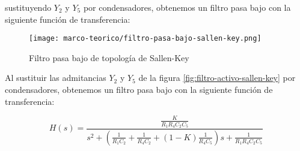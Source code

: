 sustituyendo $Y_2$ y $Y_5$ por condensadores, obtenemos un filtro pasa bajo con la siguiente función de transferencia:


\begin{figure}
    \centering
    \texttt{[image: marco-teorico/filtro-pasa-bajo-sallen-key.png]}
    \caption{Filtro pasa bajo de topología de Sallen-Key}
\end{figure}

Al sustituir las admitancias $Y_2$ y $Y_5$ de la figura \ref{fig:filtro-activo-sallen-key} por condensadores, obtenemos un filtro pasa bajo con la siguiente función de transferencia:

\begin{equation}
    H(s) = \frac{\frac{K}{R_1 R_4 C_2 C_5}}{s^2 + \left(\frac{1}{R_1 C_2} + \frac{1}{R_4 C_2} + \left(1 - K\right) \frac{1}{R_4 C_5}\right)s + \frac{1}{R_1 R_4 C_2 C_5}}
    \label{eq:transferencia-pasa-bajo-sallen-key}
\end{equation}